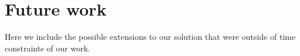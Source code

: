 



\section*{Future work}

Here we include the possible extensions to our solution that were outside of time constraints of our work.

